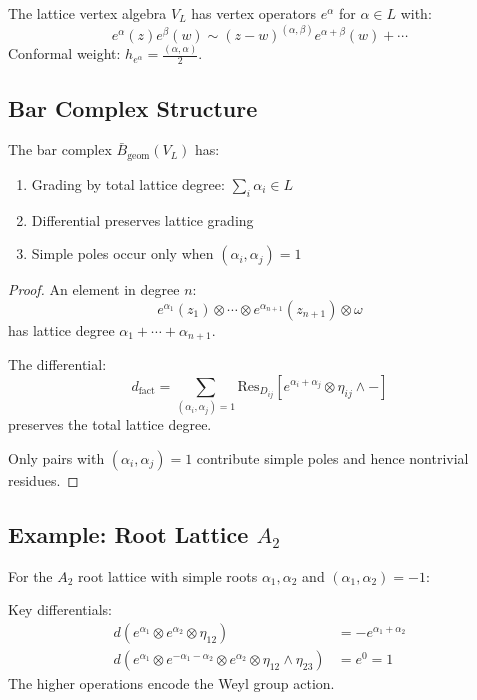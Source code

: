 \begin{definition}
The lattice vertex algebra $V_L$ has vertex operators $e^\alpha$ for $\alpha \in L$ with:
\[
e^\alpha(z)e^\beta(w) \sim (z-w)^{(\alpha,\beta)} e^{\alpha+\beta}(w) + \cdots
\]
Conformal weight: $h_{e^\alpha} = \frac{(\alpha,\alpha)}{2}$.
\end{definition}
 
\subsection{Bar Complex Structure}
 
\begin{theorem}
The bar complex $\bar{B}_{\text{geom}}(V_L)$ has:
\begin{enumerate}
\item Grading by total lattice degree: $\sum_i \alpha_i \in L$
\item Differential preserves lattice grading
\item Simple poles occur only when $(\alpha_i, \alpha_j) = 1$
\end{enumerate}
\end{theorem}
 
\begin{proof}
An element in degree $n$:
\[
e^{\alpha_1}(z_1) \otimes \cdots \otimes e^{\alpha_{n+1}}(z_{n+1}) \otimes \omega
\]
has lattice degree $\alpha_1 + \cdots + \alpha_{n+1}$.
 
The differential:
\[
d_{\text{fact}} = \sum_{(\alpha_i,\alpha_j)=1} \text{Res}_{D_{ij}}\left[e^{\alpha_i+\alpha_j} \otimes \eta_{ij} \wedge -\right]
\]
preserves the total lattice degree.
 
Only pairs with $(\alpha_i, \alpha_j) = 1$ contribute simple poles and hence nontrivial residues.
\end{proof}
 
\subsection{Example: Root Lattice $A_2$}
 
For the $A_2$ root lattice with simple roots $\alpha_1, \alpha_2$ and $(\alpha_1, \alpha_2) = -1$:
 
\begin{proposition}
Key differentials:
\begin{align}
d(e^{\alpha_1} \otimes e^{\alpha_2} \otimes \eta_{12}) &= -e^{\alpha_1+\alpha_2} \\
d(e^{\alpha_1} \otimes e^{-\alpha_1-\alpha_2} \otimes e^{\alpha_2} \otimes \eta_{12} \wedge \eta_{23}) &= e^0 = 1
\end{align}
The higher operations encode the Weyl group action.
\end{proposition}
 
